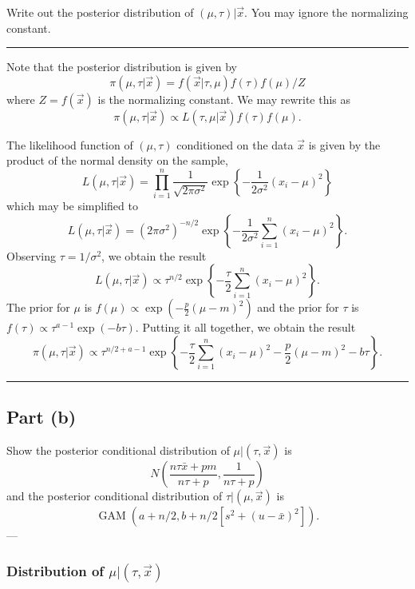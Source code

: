 \documentclass[
  11pt,
]{paper}
\begin{document}
Write out the posterior distribution of \((\mu,\tau)|\vec{x}\). You may
ignore the normalizing constant.

\begin{center}\rule{0.5\linewidth}{0.5pt}\end{center}

Note that the posterior distribution is given by \[
  \pi(\mu,\tau|\vec{x}) = f(\vec{x}|\tau,\mu)f(\tau)f(\mu) / Z
\] where \(Z = f(\vec{x})\) is the normalizing constant. We may rewrite
this as \[
  \pi(\mu,\tau|\vec{x}) \propto L(\tau,\mu|\vec{x})f(\tau)f(\mu).
\]

The likelihood function of \((\mu,\tau)\) conditioned on the data
\(\vec{x}\) is given by the product of the normal density on the sample,
\[
  L(\mu,\tau|\vec{x}) = \prod_{i=1}^{n} \frac{1}{\sqrt{2 \pi \sigma^2}} \exp\left\{-\frac{1}{2 \sigma^2}(x_i-\mu)^2\right\}
\] which may be simplified to \[
  L(\mu,\tau|\vec{x}) = \left(2 \pi \sigma^2\right)^{-n/2} \exp\left\{-\frac{1}{2\sigma^2}\sum_{i=1}^{n}(x_i-\mu)^2\right\}.
\] Observing \(\tau = 1/\sigma^2\), we obtain the result \[
  L(\mu,\tau|\vec{x}) \propto \tau^{n/2} \exp\left\{-\frac{\tau}{2}\sum_{i=1}^{n}(x_i-\mu)^2\right\}.
\] The prior for \(\mu\) is
\(f(\mu) \propto \exp\left(-\frac{p}{2}(\mu - m)^2\right)\) and the
prior for \(\tau\) is \(f(\tau) \propto \tau^{a-1} \exp(-b \tau)\).
Putting it all together, we obtain the result \[
  \pi(\mu,\tau|\vec{x}) \propto \tau^{n/2+a-1} \exp\left\{-\frac{\tau}{2}\sum_{i=1}^{n}(x_i-\mu)^2-\frac{p}{2}(\mu - m)^2 - b \tau\right\}.
\]

\begin{center}\rule{0.5\linewidth}{0.5pt}\end{center}

\hypertarget{part-b-2}{%
\subsection{Part (b)}\label{part-b-2}}

Show the posterior conditional distribution of \(\mu|(\tau,\vec{x})\) is
\[
  N\left(\frac{n \tau \bar{x} + p m}{ n \tau + p}, \frac{1}{n \tau + p}\right)
\] and the posterior conditional distribution of \(\tau|(\mu,\vec{x})\)
is \[
  \operatorname{GAM}\!\left(a+n/2,b+n/2[s^2+(u -\bar{x})^2]\right).
\] ---

\hypertarget{distribution-of-mutauvecx}{%
\subsubsection{\texorpdfstring{Distribution of
\(\mu|(\tau,\vec{x})\)}{Distribution of \textbackslash mu\textbar(\textbackslash tau,\textbackslash vec\{x\})}}\label{distribution-of-mutauvecx}}
\end{document}

